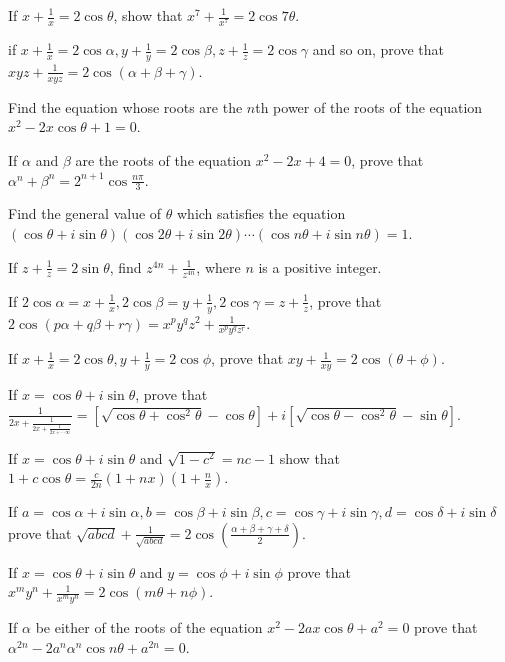 \item If $x + \frac{1}{x} = 2\cos\theta$, show that $x^7 + \frac{1}{x^7} = 2\cos7\theta$.
\item if $x + \frac{1}{x} = 2\cos\alpha, y + \frac{1}{y} = 2\cos\beta, z + \frac{1}{z} = 2\cos\gamma$ and so
  on, prove that $xyz + \frac{1}{xyz} = 2\cos(\alpha + \beta + \gamma)$.
\item Find the equation whose roots are the $n$th power of the roots of the equation $x^2 - 2x\cos\theta +
  1= 0$.
\item If $\alpha$ and $\beta$ are the roots of the equation $x^2 - 2x + 4 = 0$, prove that $\alpha^n +
  \beta^n = 2^{n + 1}\cos\frac{n\pi}{3}$.
\item Find the general value of $\theta$ which satisfies the equation $(\cos\theta +
  i\sin\theta)(\cos2\theta + i\sin2\theta)\cdots(\cos n\theta + i\sin n\theta) = 1$.
\item If $z + \frac{1}{z} = 2\sin\theta$, find $z^{4n} + \frac{1}{z^{4n}}$, where $n$ is a positive integer.
\item If $2\cos\alpha = x + \frac{1}{x}, 2\cos\beta = y + \frac{1}{y}, 2\cos\gamma = z + \frac{1}{z}$, prove
  that $2\cos(p\alpha + q\beta + r\gamma) = x^py^qz^2 + \frac{1}{x^py^qz^r}$.
\item If $x + \frac{1}{x} = 2\cos\theta, y + \frac{1}{y} = 2\cos\phi$, prove that $xy + \frac{1}{xy} =
  2\cos(\theta + \phi)$.
\item If $x = \cos\theta + i\sin\theta$, prove that $\frac{1}{2x + \frac{1}{2x + \frac{1}{2x  + \cdots
    \infty}}} = \left[\sqrt{\cos\theta + \cos^2\theta} - \cos\theta\right] + i\left[\sqrt{\cos\theta -
    \cos^2\theta} - \sin\theta\right]$.
\item If $x = \cos\theta + i\sin\theta$ and $\sqrt{1 - c^2} = nc - 1$ show that $1 + c\cos\theta =
  \frac{c}{2n}(1 + nx)\left(1 + \frac{n}{x}\right)$.
\item If $a = \cos\alpha + i\sin\alpha, b = \cos\beta + i\sin\beta, c = \cos\gamma + i\sin\gamma, d =
  \cos\delta + i\sin\delta$ prove that $\sqrt{abcd} + \frac{1}{\sqrt{abcd}} = 2\cos(\frac{\alpha + \beta
    + \gamma + \delta}{2})$.
\item If $x = \cos\theta + i\sin\theta$ and $y = \cos\phi + i\sin\phi$ prove that $x^my^n + \frac{1}{x^my^n}
  = 2\cos(m\theta + n\phi)$.
\item If $\alpha$ be either of the roots of the equation $x^2 - 2ax\cos\theta + a^2 = 0$ prove that
  $\alpha^{2n} - 2a^n\alpha^n\cos n\theta + a^{2n} = 0$.
